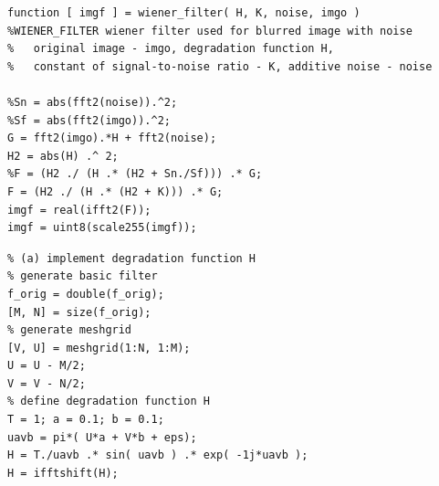 \lstset{language=Matlab} 
\begin{lstlisting}
function [ imgf ] = wiener_filter( H, K, noise, imgo )
%WIENER_FILTER wiener filter used for blurred image with noise
%   original image - imgo, degradation function H, 
%   constant of signal-to-noise ratio - K, additive noise - noise

%Sn = abs(fft2(noise)).^2;
%Sf = abs(fft2(imgo)).^2;
G = fft2(imgo).*H + fft2(noise);
H2 = abs(H) .^ 2;
%F = (H2 ./ (H .* (H2 + Sn./Sf))) .* G;
F = (H2 ./ (H .* (H2 + K))) .* G;
imgf = real(ifft2(F));
imgf = uint8(scale255(imgf));
\end{lstlisting}
\lstset{language=Matlab} 
\begin{lstlisting}
% (a) implement degradation function H
% generate basic filter
f_orig = double(f_orig);
[M, N] = size(f_orig);
% generate meshgrid
[V, U] = meshgrid(1:N, 1:M);
U = U - M/2;
V = V - N/2;
% define degradation function H
T = 1; a = 0.1; b = 0.1;
uavb = pi*( U*a + V*b + eps);
H = T./uavb .* sin( uavb ) .* exp( -1j*uavb );
H = ifftshift(H);
\end{lstlisting}

